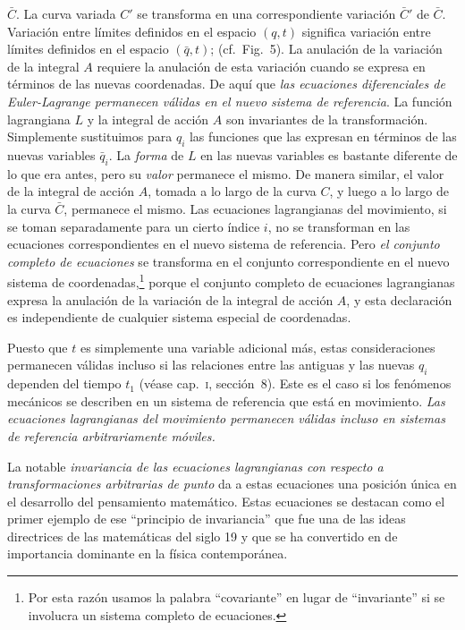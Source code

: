 \documentclass[12pt,a4paper]{book}
\begin{document}
$\bar{C}$. La curva variada $C'$ se transforma en una correspondiente variación $\bar{C}'$ de $\bar{C}$. Variación entre límites definidos en el espacio $(q,t)$ significa variación entre límites definidos en el espacio $(\bar{q},t)$; (cf.\ Fig.~5). La anulación de la variación de la integral $A$ requiere la anulación de esta variación cuando se expresa en términos de las nuevas coordenadas. De aquí que \textit{las ecuaciones diferenciales de Euler-Lagrange permanecen válidas en el nuevo sistema de referencia}. La función lagrangiana $L$ y la integral de acción $A$ son invariantes de la transformación. Simplemente sustituimos para $q_i$ las funciones que las expresan en términos de las nuevas variables $\bar{q}_i$. La \textit{forma} de $L$ en las nuevas variables es bastante diferente de lo que era antes, pero su \textit{valor} permanece el mismo. De manera similar, el valor de la integral de acción $A$, tomada a lo largo de la curva $C$, y luego a lo largo de la curva $\bar{C}$, permanece el mismo. Las ecuaciones lagrangianas del movimiento, si se toman separadamente para un cierto índice $i$, no se transforman en las ecuaciones correspondientes en el nuevo sistema de referencia. Pero \textit{el conjunto completo de ecuaciones} se transforma en el conjunto correspondiente en el nuevo sistema de coordenadas,\footnote{Por esta razón usamos la palabra ``covariante'' en lugar de ``invariante'' si se involucra un sistema completo de ecuaciones.} porque el conjunto completo de ecuaciones lagrangianas expresa la anulación de la variación de la integral de acción $A$, y esta declaración es independiente de cualquier sistema especial de coordenadas.

Puesto que $t$ es simplemente una variable adicional más, estas consideraciones permanecen válidas incluso si las relaciones entre las antiguas y las nuevas $q_i$ dependen del tiempo $t_1$ (véase cap.~\textsc{i}, sección~8). Este es el caso si los fenómenos mecánicos se describen en un sistema de referencia que está en movimiento. \textit{Las ecuaciones lagrangianas del movimiento permanecen válidas incluso en sistemas de referencia arbitrariamente móviles.}

La notable \textit{invariancia de las ecuaciones lagrangianas con respecto a transformaciones arbitrarias de punto} da a estas ecuaciones una posición única en el desarrollo del pensamiento matemático. Estas ecuaciones se destacan como el primer ejemplo de ese ``principio de invariancia'' que fue una de las ideas directrices de las matemáticas del siglo 19 y que se ha convertido en de importancia dominante en la física contemporánea.
\end{document}
